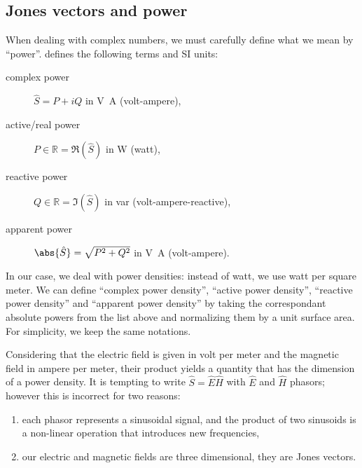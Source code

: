 \subsection{Jones vectors and power}
\label{sec:jones_vectors_and_power}
When dealing with complex numbers, we must carefully define what we mean by ``power''.
 \cite{IEEE2002dictionary} defines the following terms and SI units:
\begin{description}
    \item[complex power]\quad%
    $\hat{S} = P + iQ$\quad%
    in \si{\volt\ampere} (volt-ampere),
    \item[active/real power]\quad%
    $P \in \mathbb{R} = \Re(\hat{S})$\quad%
    in \si{\watt} (watt),
    \item[reactive power]\quad%
    $Q \in \mathbb{R} = \Im(\hat{S})$\quad%
    in \si{var} (volt-ampere-reactive),
    \item[apparent power]\quad%
    $\abs{\hat{S}} = \sqrt{P^2 + Q^2}$\quad%
    in \si{\volt\ampere} (volt-ampere).
\end{description}
In our case, we deal with power densities: instead of watt, we use watt per square meter.
We can define ``complex power density'', ``active power density'', ``reactive power density'' and ``apparent power density'' by taking the correspondant absolute powers from the list above and normalizing them by a unit surface area.
For simplicity, we keep the same notations.

Considering that the electric field is given in volt per meter and the magnetic field in ampere per meter, their product yields a quantity that has the dimension of a power density.
It is tempting to write $\hat{S}=\hat{E}\hat{H}$ with $\hat{E}$ and $\hat{H}$ phasors;
however this is incorrect for two reasons:
\begin{enumerate}
    \item each phasor represents a sinusoidal signal, and the product of two sinusoids is a non-linear operation that introduces new frequencies,
    \item our electric and magnetic fields are three dimensional, they are Jones vectors.
\end{enumerate}

